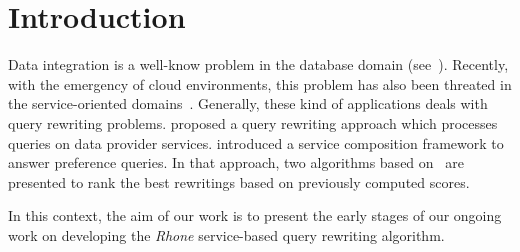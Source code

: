\section{Introduction}
Data integration is a well-know problem in the database domain (see~\cite{Halevy:2001}). 
Recently, with the emergency of cloud environments, this problem has also been threated in the service-oriented domains~\cite{Barhamgi2010,Benouaret2011,ba2014}.
Generally, these kind of applications deals with query rewriting problems.
\cite{Barhamgi2010} proposed a query rewriting approach which processes queries on data provider services. \cite{Benouaret2011} introduced a service composition framework to answer preference queries. In that approach, two algorithms based on~\cite{Barhamgi2010} are presented to rank the best rewritings based on previously computed scores.

In this context, the aim of our work is to present the early stages of our
ongoing work on developing the \textit{Rhone} service-based query rewriting
algorithm.

